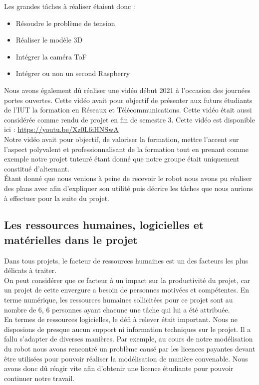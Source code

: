 \documentclass{PackagerQualityN}
\begin{document}
Les grandes tâches à réaliser étaient donc :
\begin{itemize}
    \item Résoudre le problème de tension
    \item Réaliser le modèle 3D
    \item Intégrer la caméra ToF
    \item Intégrer ou non un second Raspberry\\
\end{itemize}

Nous avons également dû réaliser une vidéo début 2021 à l'occasion des journées portes ouvertes. Cette vidéo avait pour objectif de présenter aux futurs étudiants de l'IUT la formation en Réseaux et Télécommunications. Cette vidéo était aussi considérée comme rendu de projet en fin de semestre 3. Cette vidéo est disponible ici : \url{https://youtu.be/Xz0L6iHNSwA}\\


Notre vidéo avait pour objectif, de valoriser la formation, mettre l'accent sur l'aspect polyvalent et professionnalisant de la formation tout en prenant comme exemple notre projet tuteuré étant donné que notre groupe était uniquement constitué d'alternant.\\

Étant donné que nous venions à peine de recevoir le robot nous avons pu réaliser des plans avec afin d’expliquer son utilité puis décrire les tâches que nous aurions à effectuer pour la suite du projet.\\


\subsection*{Les ressources humaines, logicielles et matérielles dans le projet}
Dans tous projets, le facteur de ressources humaines est un des facteurs les plus délicats à traiter.\\

On peut considérer que ce facteur à un impact sur la productivité du projet, car un projet de cette envergure a besoin de personnes motivées et compétentes. En terme numérique, les ressources humaines sollicitées pour ce projet sont au nombre de 6, 6 personnes ayant chacune une tâche qui lui a été attribuée. \\

En termes de ressources logicielles, le défi à relever était important. Nous ne disposions de presque aucun support ni information techniques sur le projet. Il a fallu s'adapter de diverses manières. Par exemple, au cours de notre modélisation du robot nous avons rencontré un problème causé par les licences payantes devant être utilisées pour pouvoir réaliser la modélisation de manière convenable. Nous avons donc dû réagir vite afin d'obtenir une licence étudiante pour pouvoir continuer notre travail.\\
\end{document}
